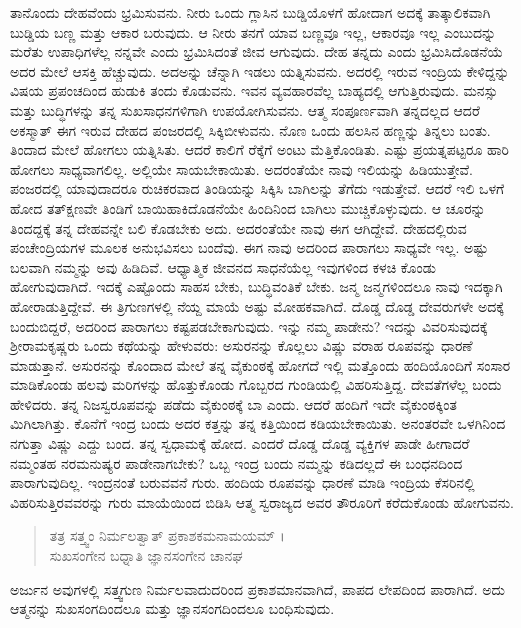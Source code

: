 ತಾನೊಂದು ದೇಹವೆಂದು ಭ್ರಮಿಸುವನು. ನೀರು ಒಂದು ಗ್ಲಾಸಿನ ಬುಡ್ಡಿಯೊಳಗೆ ಹೋದಾಗ ಅದಕ್ಕೆ ತಾತ್ಕಾಲಿಕವಾಗಿ ಬುಡ್ಡಿಯ ಬಣ್ಣ ಮತ್ತು ಆಕಾರ ಬರುವುದು. ಆ ನೀರು ತನಗೆ ಯಾವ ಬಣ್ಣವೂ ಇಲ್ಲ, ಆಕಾರವೂ ಇಲ್ಲ ಎಂಬುದನ್ನು ಮರೆತು ಉಪಾಧಿಗಳೆಲ್ಲ ನನ್ನವೇ ಎಂದು ಭ್ರಮಿಸಿದಂತೆ ಜೀವ ಆಗುವುದು. ದೇಹ ತನ್ನದು ಎಂದು ಭ್ರಮಿಸಿದೊಡನೆಯೆ ಅದರ ಮೇಲೆ ಆಸಕ್ತಿ ಹೆಚ್ಚುವುದು. ಅದಅನ್ನು ಚೆನ್ನಾಗಿ ಇಡಲು ಯತ್ನಿಸುವನು. ಅದರಲ್ಲಿ ಇರುವ ಇಂದ್ರಿಯ ಕೇಳಿದ್ದನ್ನು ವಿಷಯ ಪ್ರಪಂಚದಿಂದ ಹುಡುಕಿ ತಂದು ಕೊಡುವನು. ಇವನ ವ್ಯವಹಾರವೆಲ್ಲ ಬಾಹ್ಯದಲ್ಲಿ ಆಗುತ್ತಿರುವುದು. ಮನಸ್ಸು ಮತ್ತು ಬುದ್ಧಿಗಳನ್ನು ತನ್ನ ಸುಖಸಾಧನಗಳಿಗಾಗಿ ಉಪಯೋಗಿಸುವನು. ಆತ್ಮ ಸಂಪೂರ್ಣವಾಗಿ ತನ್ನದಲ್ಲದ ಆದರೆ ಅಕಸ್ಮಾತ್ ಈಗ ಇರುವ ದೇಹದ ಪಂಜರದಲ್ಲಿ ಸಿಕ್ಕಿಬೀಳುವನು. ನೊಣ ಒಂದು ಹಲಸಿನ ಹಣ್ಣನ್ನು ತಿನ್ನಲು ಬಂತು. ತಿಂದಾದ ಮೇಲೆ ಹೋಗಲು ಯತ್ನಿಸಿತು. ಆದರೆ ಕಾಲಿಗೆ ರೆಕ್ಕೆಗೆ ಅಂಟು ಮೆತ್ತಿಕೊಂಡಿತು. ಎಷ್ಟು ಪ್ರಯತ್ನಪಟ್ಟರೂ ಹಾರಿ ಹೋಗಲು ಸಾಧ್ಯವಾಗಲಿಲ್ಲ. ಅಲ್ಲಿಯೇ ಸಾಯಬೇಕಾಯಿತು. ಅದರಂತೆಯೇ ನಾವು ಇಲಿಯನ್ನು ಹಿಡಿಯುತ್ತೇವೆ. ಪಂಜರದಲ್ಲಿ ಯಾವುದಾದರೂ ರುಚಿಕರವಾದ ತಿಂಡಿಯನ್ನು ಸಿಕ್ಕಿಸಿ ಬಾಗಿಲನ್ನು ತೆಗೆದು ಇಡುತ್ತೇವೆ. ಆದರೆ ಇಲಿ ಒಳಗೆ ಹೋದ ತತ್​ಕ್ಷಣವೇ ತಿಂಡಿಗೆ ಬಾಯಿಹಾಕಿದೊಡನೆಯೇ ಹಿಂದಿನಿಂದ ಬಾಗಿಲು ಮುಚ್ಚಿಕೊಳ್ಳುವುದು. ಆ ಚೂರನ್ನು ತಿಂದದ್ದಕ್ಕೆ ತನ್ನ ದೇಹವನ್ನೇ ಬಲಿ ಕೊಡಬೇಕು ಅದು. ಅದರಂತೆಯೇ ನಾವು ಈಗ ಆಗಿದ್ದೇವೆ. ದೇಹದಲ್ಲಿರುವ ಪಂಚೇಂದ್ರಿಯಗಳ ಮೂಲಕ ಅನುಭವಿಸಲು ಬಂದೆವು. ಈಗ ನಾವು ಅದರಿಂದ ಪಾರಾಗಲು ಸಾಧ್ಯವೇ ಇಲ್ಲ. ಅಷ್ಟು ಬಲವಾಗಿ ನಮ್ಮನ್ನು ಅವು ಹಿಡಿದಿವೆ. ಆಧ್ಯಾತ್ಮಿಕ ಜೀವನದ ಸಾಧನೆಯೆಲ್ಲ ಇವುಗಳಿಂದ ಕಳಚಿ ಕೊಂಡು ಹೋಗುವುದಾಗಿದೆ. ಇದಕ್ಕೆ ಎಷ್ಟೊಂದು ಸಾಹಸ ಬೇಕು, ಬುದ್ಧಿವಂತಿಕೆ ಬೇಕು. ಜನ್ಮ ಜನ್ಮಗಳಿಂದಲೂ ನಾವು ಇದಕ್ಕಾಗಿ ಹೋರಾಡುತ್ತಿದ್ದೇವೆ. ಈ ತ್ರಿಗುಣಗಳಲ್ಲಿ ನೆಯ್ದ ಮಾಯೆ ಅಷ್ಟು ಮೋಹಕವಾಗಿದೆ. ದೊಡ್ಡ ದೊಡ್ಡ ದೇವರುಗಳೇ ಅದಕ್ಕೆ ಬಂದುಬಿದ್ದರೆ, ಅದರಿಂದ ಪಾರಾಗಲು ಕಷ್ಟಪಡಬೇಕಾಗುವುದು. ಇನ್ನು ನಮ್ಮ ಪಾಡೇನು? ಇದನ್ನು ವಿವರಿಸುವುದಕ್ಕೆ ಶ್ರೀರಾಮಕೃಷ್ಣರು ಒಂದು ಕಥೆಯನ್ನು ಹೇಳುವರು: ಅಸುರನನ್ನು ಕೊಲ್ಲಲು ವಿಷ್ಣು ವರಾಹ ರೂಪವನ್ನು ಧಾರಣೆ ಮಾಡುತ್ತಾನೆ. ಅಸುರನನ್ನು ಕೊಂದಾದ ಮೇಲೆ ತನ್ನ ವೈಕುಂಠಕ್ಕೆ ಹೋಗದೆ ಇಲ್ಲಿ ಮತ್ತೊಂದು ಹಂದಿಯೊಂದಿಗೆ ಸಂಸಾರ ಮಾಡಿಕೊಂಡು ಹಲವು ಮರಿಗಳನ್ನು ಹೊತ್ತುಕೊಂಡು ಗೊಬ್ಬರದ ಗುಂಡಿಯಲ್ಲಿ ವಿಹರಿಸುತ್ತಿದ್ದ. ದೇವತೆಗಳೆಲ್ಲ ಬಂದು ಹೇಳಿದರು. ತನ್ನ ನಿಜಸ್ವರೂಪವನ್ನು ಪಡೆದು ವೈಕುಂಠಕ್ಕೆ ಬಾ ಎಂದು. ಆದರೆ ಹಂದಿಗೆ ಇದೇ ವೈಕುಂಠಕ್ಕಿಂತ ಮಿಗಿಲಾಗಿತ್ತು. ಕೊನೆಗೆ ಇಂದ್ರ ಬಂದು ಅದರ ಕತ್ತನ್ನು ತನ್ನ ಕತ್ತಿಯಿಂದ ಕಡಿಯಬೇಕಾಯಿತು. ಅನಂತರವೇ ಒಳಗಿನಿಂದ ನಗುತ್ತಾ ವಿಷ್ಣು ಎದ್ದು ಬಂದ. ತನ್ನ ಸ್ವಧಾಮಕ್ಕೆ ಹೋದ. ಎಂದರೆ ದೊಡ್ಡ ದೊಡ್ಡ ವ್ಯಕ್ತಿಗಳ ಪಾಡೇ ಹೀಗಾದರೆ ನಮ್ಮಂತಹ ನರಮನುಷ್ಯರ ಪಾಡೇನಾಗಬೇಕು? ಒಬ್ಬ ಇಂದ್ರ ಬಂದು ನಮ್ಮನ್ನು ಕಡಿದಲ್ಲದೆ ಈ ಬಂಧನದಿಂದ ಪಾರಾಗುವುದಿಲ್ಲ. ಇಂದ್ರನಂತೆ ಬರುವವನೆ ಗುರು. ಹಂದಿಯ ರೂಪವನ್ನು ಧಾರಣೆ ಮಾಡಿ ಇಂದ್ರಿಯ ಕೆಸರಿನಲ್ಲಿ ವಿಹರಿಸುತ್ತಿರವವರನ್ನು ಗುರು ಮಾಯೆಯಿಂದ ಬಿಡಿಸಿ ಆತ್ಮ ಸ್ವರಾಜ್ಯದ ಅವರ ತೌರೂರಿಗೆ ಕರೆದುಕೊಂಡು ಹೋಗುವನು.

\begin{verse}
ತತ್ರ ಸತ್ತ್ವಂ ನಿರ್ಮಲತ್ವಾತ್ ಪ್ರಕಾಶಕಮನಾಮಯಮ್ ।\\ಸುಖಸಂಗೇನ ಬಧ್ನಾತಿ ಜ್ಞಾನಸಂಗೇನ ಚಾನಘ 
\end{verse}

{\small ಅರ್ಜುನ ಅವುಗಳಲ್ಲಿ ಸತ್ತ್ವಗುಣ ನಿರ್ಮಲವಾದುದರಿಂದ ಪ್ರಕಾಶಮಾನವಾಗಿದೆ, ಪಾಪದ ಲೇಪದಿಂದ ಪಾರಾಗಿದೆ. ಅದು ಆತ್ಮನನ್ನು ಸುಖಸಂಗದಿಂದಲೂ ಮತ್ತು ಜ್ಞಾನಸಂಗದಿಂದಲೂ ಬಂಧಿಸುವುದು.}

